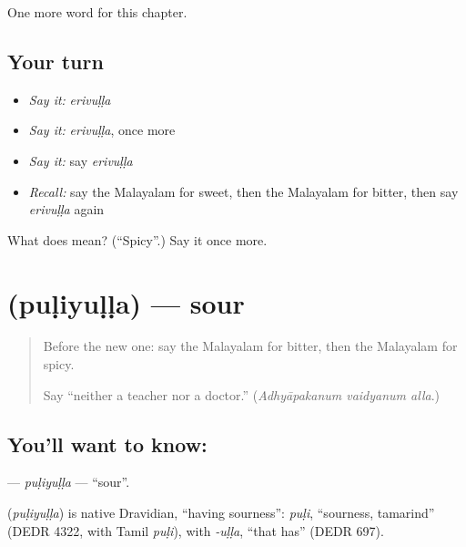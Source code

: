 \begin{grammarlens}[title={What you've built}]
One more word for this chapter.
\end{grammarlens}

\subsection*{Your turn}
\begin{itemize}
\raggedright
  \item \emph{Say it:} \emph{erivuḷḷa}
  \item \emph{Say it:} \emph{erivuḷḷa}, once more
  \item \emph{Say it:} say \emph{erivuḷḷa}
  \item \emph{Recall:} say the Malayalam for sweet, then the Malayalam for bitter, then say \emph{erivuḷḷa} again
\end{itemize}

\begin{tcolorbox}[breakable,colback=teal!4,colframe=teal!35!black,title={Before you move on}]
What does  mean? (\textquotedblleft{}Spicy\textquotedblright{}.) Say it once more.
\end{tcolorbox}
\section[\texorpdfstring{\ml{പുളിയുള്ള} (puḷiyuḷḷa)}{പുളിയുള്ള (puḷiyuḷḷa)}]{ (puḷiyuḷḷa) — sour}

\label{lesson:ML-C165-puliyulla}



\begin{quote}
Before the new one: say the Malayalam for bitter, then the Malayalam for spicy.

Say \textquotedblleft{}neither a teacher nor a doctor.\textquotedblright{} (\emph{Adhyāpakanum vaidyanum alla}.)
\end{quote}

\subsection*{You'll want to know: }
\textbf{} — \emph{puḷiyuḷḷa} — \textquotedblleft{}sour\textquotedblright{}.

\begin{cousinweb}
\textbf{} (\emph{puḷiyuḷḷa}) is native Dravidian, \textquotedblleft{}having sourness\textquotedblright{}: \emph{puḷi}, \textquotedblleft{}sourness, tamarind\textquotedblright{} (DEDR 4322, with Tamil \emph{puḷi}), with \emph{-uḷḷa}, \textquotedblleft{}that has\textquotedblright{} (DEDR 697).
\end{cousinweb}

